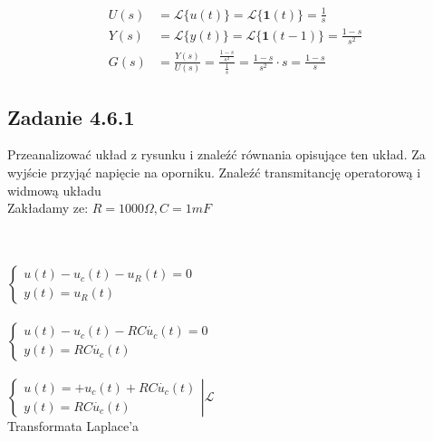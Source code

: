 \begin{align*}
U(s) & = \mathscr{L}\{ u(t) \} = \mathscr{L}\{ \mathbf{1}(t) \} = \frac{1}{s} \\
Y(s) & = \mathscr{L}\{ y(t) \} = \mathscr{L}\{ \mathbf{1}(t-1) \} = \frac{1-s}{s^2} \\
G(s) & = \frac{Y(s)}{U(s)} = \frac{\frac{1-s}{s^2}}{\frac{1}{s}} = \frac{1-s}{s^2} \cdot s = \frac{1-s}{s}
\end{align*}


\pagebreak
\subsection*{Zadanie 4.6.1} {\color{darkgray}
	\begin{figure}[!h]
	\end{figure}
	\noindent Przeanalizować układ z rysunku i znaleźć równania opisujące ten układ. Za wyjście
	przyjąć napięcie na oporniku. Znaleźć transmitancję operatorową i widmową układu\\
	Zakładamy ze: $R=1000\Omega,C=1mF$\\
}\lineh
\\\\
\noindent $\begin{cases}
u(t)-u_c(t)-u_R(t)=0\\
y(t)=u_R(t)
\end{cases}$\\\\
$\begin{cases}
u(t)-u_c(t)-RC\dot{u_c}(t)=0\\
y(t)=RC\dot{u_c}(t)
\end{cases}$\\\\
$\left.\begin{cases}
u(t)=+u_c(t)+RC\dot{u_c}(t)\\
y(t)=RC\dot{u_c}(t)
\end{cases}\right|\mathscr{L}$\\
Transformata Laplace'a\\
